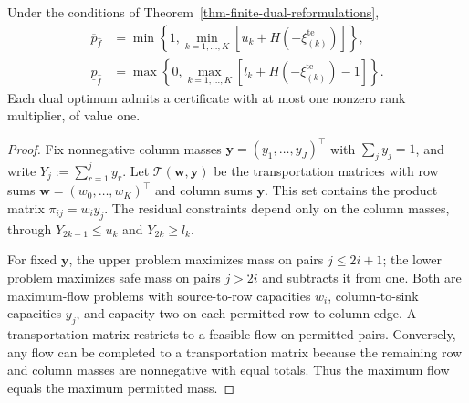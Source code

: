 \begin{corollary}
  \label{thm-closed-form-bounds}
  Under the conditions of Theorem~\ref{thm-finite-dual-reformulations},
  \begin{align}
    \overline p_{\hat f}
      &=\min\left\{1,\min_{k=1,\ldots,K}\left[u_k+H\left(-\xi_{(k)}^{\mathrm{te}}\right)\right]\right\},
      \label{eq-dw-closed-upper}\\
    \underline p_{\hat f}
      &=\max\left\{0,\max_{k=1,\ldots,K}\left[l_k+H\left(-\xi_{(k)}^{\mathrm{te}}\right)-1\right]\right\}.
      \label{eq-dw-closed-lower}
  \end{align}
  Each dual optimum admits a certificate with at most one nonzero rank multiplier, of value one.
\end{corollary}
\begin{proof}
  Fix nonnegative column masses $\bm y=(y_1,\ldots,y_J)^\top$ with $\sum_j y_j=1$, and write $Y_j:=\sum_{r=1}^{j}y_r$. Let $\mathcal T(\bm w,\bm y)$ be the transportation matrices with row sums $\bm w=(w_0,\ldots,w_K)^\top$ and column sums $\bm y$. This set contains the product matrix $\pi_{ij}=w_i y_j$. The residual constraints depend only on the column masses, through $Y_{2k-1}\le u_k$ and $Y_{2k}\ge l_k$.

  For fixed $\bm y$, the upper problem maximizes mass on pairs $j\le2i+1$; the lower problem maximizes safe mass on pairs $j>2i$ and subtracts it from one. Both are maximum-flow problems with source-to-row capacities $w_i$, column-to-sink capacities $y_j$, and capacity two on each permitted row-to-column edge. A transportation matrix restricts to a feasible flow on permitted pairs. Conversely, any flow can be completed to a transportation matrix because the remaining row and column masses are nonnegative with equal totals. Thus the maximum flow equals the maximum permitted mass.


\end{proof}
